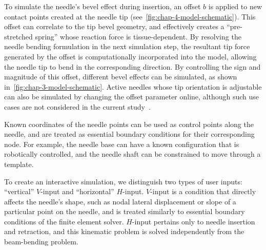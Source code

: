To simulate the needle's bevel effect during insertion, an offset $b$ is applied to new contact points created at the needle tip (see~\cref{fig:chap-4-model-schematic}). This offset can correlate to the tip bevel geometry, and effectively creates a ``pre-stretched spring'' whose reaction force is tissue-dependent. By resolving the needle bending formulation in the next simulation step, the resultant tip force generated by the offset is computationally incorporated into the model, allowing the needle tip to bend in the corresponding direction. By controlling the sign and magnitude of this offset, different bevel effects can be simulated, as shown in~\cref{fig:chap-3-model-schematic}. Active needles whose tip orientation is adjustable can also be simulated by changing the offset parameter online, although such use cases are not considered in the current study~\parencite{ryuFeasibilityStudyOptically2011,karimi3DSteerableActive2019,padasdaoShapeMemoryAlloy2020}.

Known coordinates of the needle points can be used as control points along the needle, and are treated as essential boundary conditions for their corresponding node. For example, the needle base can have a known configuration that is robotically controlled, and the needle shaft can be constrained to move through a template.

To create an interactive simulation, we distinguish two types of user inputs: ``vertical'' $V$-input and ``horizontal'' $H$-input. $V$-input is a condition that directly affects the needle's shape, such as nodal lateral displacement or slope of a particular point on the needle, and is treated similarly to essential boundary conditions of the finite element solver. $H$-input pertains only to needle insertion and retraction, and this kinematic problem is solved independently from the beam-bending problem. 

